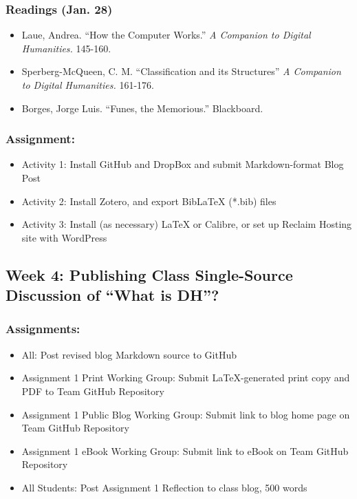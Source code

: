 \documentclass[]{article}
\begin{document}
\subsubsection{Readings (Jan. 28)}\label{readings-jan.-28}

\begin{itemize}
\itemsep1pt\parskip0pt
\item
  Laue, Andrea. ``How the Computer Works.'' \emph{A Companion to Digital
  Humanities.} 145-160.
\item
  Sperberg-McQueen, C. M. ``Classification and its Structures'' \emph{A
  Companion to Digital Humanities.} 161-176.
\item
  Borges, Jorge Luis. ``Funes, the Memorious.'' Blackboard.
\end{itemize}

\subsubsection{Assignment:}\label{assignment-2}

\begin{itemize}
\itemsep1pt\parskip0pt
\item
  Activity 1: Install GitHub and DropBox and submit Markdown-format Blog
  Post
\item
  Activity 2: Install Zotero, and export BibLaTeX (*.bib) files
\item
  Activity 3: Install (as necessary) LaTeX or Calibre, or set up Reclaim
  Hosting site with WordPress
\end{itemize}

\subsection{Week 4: Publishing Class Single-Source Discussion of ``What
is
DH''?}\label{week-4-publishing-class-single-source-discussion-of-what-is-dh}

\subsubsection{Assignments:}\label{assignments}

\begin{itemize}
\itemsep1pt\parskip0pt
\item
  All: Post revised blog Markdown source to GitHub
\item
  Assignment 1 Print Working Group: Submit LaTeX-generated print copy
  and PDF to Team GitHub Repository
\item
  Assignment 1 Public Blog Working Group: Submit link to blog home page
  on Team GitHub Repository
\item
  Assignment 1 eBook Working Group: Submit link to eBook on Team GitHub
  Repository
\item
  All Students: Post Assignment 1 Reflection to class blog, 500 words
\end{itemize}
\end{document}
